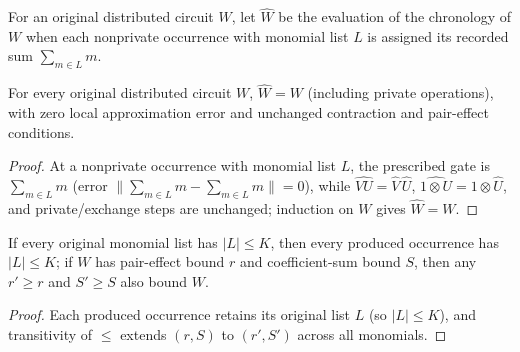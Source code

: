 \begin{definition}
    \label{def:peps_original_recorded_gate_maps}
    \leanok
    For an original distributed circuit $W$, let $\widehat W$ be the evaluation
    of the chronology of $W$ when each nonprivate occurrence with monomial list
    $L$ is assigned its recorded sum $\sum_{m\in L}m$.
\end{definition}

\begin{lemma}
    \label{thm:peps_original_exact_gate_maps}
    \leanok
    For every original distributed circuit $W$, $\widehat W=W$ (including
    private operations), with zero local approximation error and unchanged
    contraction and pair-effect conditions.
\end{lemma}
\begin{proof}\leanok
    At a nonprivate occurrence with monomial list $L$, the prescribed gate is
    $\sum_{m\in L}m$ (error $\bigl\|\sum_{m\in L}m-\sum_{m\in L}m\bigr\|=0$),
    while $\widehat{VU}=\widehat V\,\widehat U$,
    $\widehat{1\otimes U}=1\otimes\widehat U$, and private/exchange steps are
    unchanged; induction on $W$ gives $\widehat W=W$.
\end{proof}

\begin{lemma}
    \label{thm:peps_original_produced_resource_bounds}
    \leanok
    If every original monomial list has $|L|\le K$, then every produced
    occurrence has $|L|\le K$; if $W$ has pair-effect bound $r$ and
    coefficient-sum bound $S$, then any $r'\ge r$ and $S'\ge S$ also bound $W$.
\end{lemma}
\begin{proof}\leanok
    Each produced occurrence retains its original list $L$ (so $|L|\le K$), and
    transitivity of $\le$ extends $(r,S)$ to $(r',S')$ across all monomials.
\end{proof}
